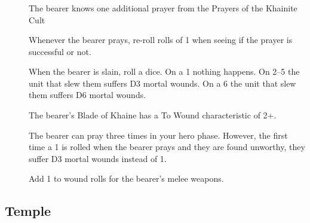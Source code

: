 \subsubsection{}
\begin{description} 
    \item [] The bearer knows one additional
        prayer from the Prayers of the Khainite Cult 
    \item [] Whenever the bearer prays,
        re-roll rolls of 1 when seeing if the prayer is successful or not.
    \item [] When the bearer is slain,
        roll a dice. On a 1 nothing happens. On 2--5 the unit that slew them
        suffers D3 mortal wounds. On a 6 the unit that slew them suffers D6
        mortal wounds.
    \item [] The bearer’s Blade of Khaine
        has a To Wound characteristic of 2+.
    \item [] The bearer can pray
        three times in your hero phase. However, the first time a 1 is rolled
        when the bearer prays and they are found unworthy, they suffer D3
        mortal wounds instead of 1.
    \item [] Add 1 to wound rolls for the bearer’s
        melee weapons.
\end{description} 


\hypertarget{temple}{%
    \subsection{Temple}\label{temple}}
